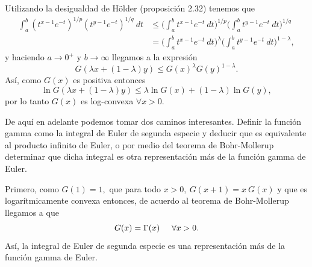 Utilizando la desigualdad de Hölder (proposición 2.32) tenemos que 
\begin{align*}
	\int_{a}^{b}(t^{x-1}e^{-t})^{1/p}(t^{y-1}e^{-t})^{1/q}\ dt &\leq \bigg(\int_{a}^{b}t^{x-1}e^{-t}\ dt\bigg)^{1/p}\bigg(\int_{a}^{b}t^{y-1}e^{-t}\ dt\bigg)^{1/q}\\
	&= \bigg(\int_{a}^{b}t^{x-1}e^{-t}\ dt\bigg)^{\lambda}\bigg(\int_{a}^{b}t^{y-1}e^{-t}\ dt\bigg)^{1-\lambda},
\end{align*}
y haciendo $a \rightarrow 0^+$ y $b \rightarrow \infty$ llegamos a la expresión $$G(\lambda x + (1-\lambda)y) \leq G(x)^\lambda G(y)^{1-\lambda}.$$ Así, como $G(x)$ es positiva entonces $$\ln G(\lambda x + (1-\lambda)y) \leq \lambda\ln G(x)+(1-\lambda)\ln G(y),$$ por lo tanto $G(x)$ es log-convexa $\forall x > 0.$

De aquí en adelante podemos tomar dos caminos interesantes. Definir la función gamma como la integral de Euler de segunda especie y deducir que es equivalente al producto infinito de Euler, o por medio del teorema de Bohr-Mollerup determinar que dicha integral es otra representación más de la función gamma de Euler. 

Primero, como $G(1) = 1,$ que para todo $x > 0,\ G(x+1) = x\ G(x)$ y que es logarítmicamente convexa entonces, de acuerdo al teorema de Bohr-Mollerup llegamos a que $$G(x) = \Gamma(x)\hspace{0.5cm}\forall x > 0.$$ Así, la integral de Euler de segunda especie es una representación más de la función gamma de Euler.


